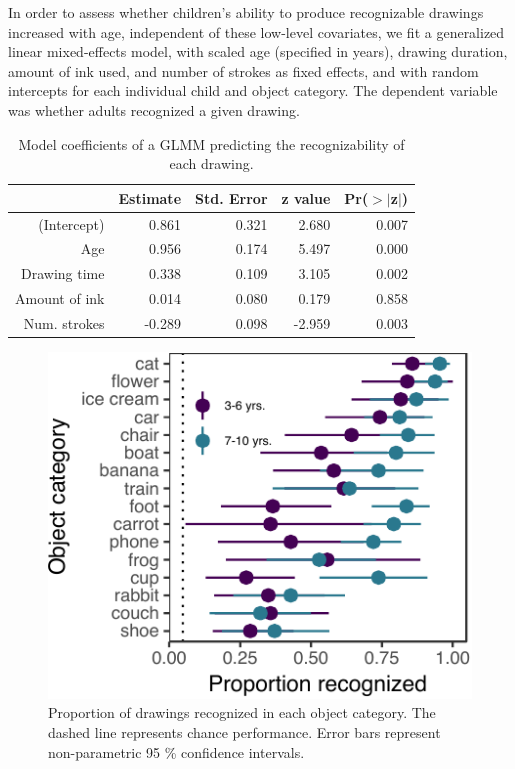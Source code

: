 \documentclass[10pt, letterpaper]{article}
\newenvironment{CodeChunk}{}{}
\begin{document}
In order to assess whether children's ability to produce recognizable
drawings increased with age, independent of these low-level covariates,
we fit a generalized linear mixed-effects model, with scaled age
(specified in years), drawing duration, amount of ink used, and number
of strokes as fixed effects, and with random intercepts for each
individual child and object category. The dependent variable was whether
adults recognized a given drawing.

\begin{table}[H]
\centering
\begin{tabular}{rrrrr}
  \hline
 & Estimate & Std. Error & z value & Pr($>$$|$z$|$) \\
  \hline
(Intercept) & 0.861 & 0.321 & 2.680 & 0.007 \\
  Age & 0.956 & 0.174 & 5.497 & 0.000 \\
  Drawing time & 0.338 & 0.109 & 3.105 & 0.002 \\
  Amount of ink & 0.014 & 0.080 & 0.179 & 0.858 \\
  Num. strokes & -0.289 & 0.098 & -2.959 & 0.003 \\
   \hline
\end{tabular}
\caption{Model coefficients of a GLMM predicting the recognizability of each drawing.}
\end{table}

\begin{CodeChunk}
\begin{figure}[H]

{\centering \includegraphics{figs/recognizabilityByItem-1} 

}

\caption[Proportion of drawings recognized in each object category]{Proportion of drawings recognized in each object category. The dashed line represents chance performance. Error bars represent non-parametric 95 \% confidence intervals. }\label{fig:recognizabilityByItem}
\end{figure}
\end{CodeChunk}
\end{document}
